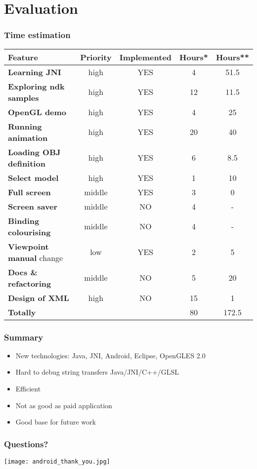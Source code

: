 \section{Evaluation} %
\begin{frame}\frametitle{Time estimation} 
\begin{tabular}{| l || c | c |  c | c |}
\hline
Feature & Priority & Implemented & Hours* & Hours**\\
\hline
\hline
\textbf{Learning JNI} & high & YES &                 4 & 51.5\\
\textbf{Exploring ndk samples} & high & YES &       12 & 11.5\\
\textbf{OpenGL demo} & high & YES &                  4 & 25\\
\textbf{Running animation} & high & YES &           20 & 40\\
\textbf{Loading OBJ definition} & high & YES &       6 &  8.5\\
\textbf{Select model} & high & YES &                 1 & 10\\
\textbf{Full screen} & middle & YES &                3 &  0\\
\textbf{Screen saver} & middle & NO &                4 &  -\\
\textbf{Binding colourising} & middle & NO &         4 & -\\
\textbf{Viewpoint manual} change & low & YES &       2 & 5\\
\textbf{Docs \& refactoring} & middle & NO &         5 & 20\\
\textbf{Design of XML} & high & NO &                15 & 1\\
\hline
\textbf{Totally} & & &                                80 & 172.5 \\
\hline
\end{tabular}
\end{frame}

\begin{frame}\frametitle{Summary} 
\begin{itemize}
    \item New technologies: Java, JNI, Android, Eclipse, OpenGLES 2.0
    \item Hard to debug string transfers Java/JNI/C++/GLSL
    \item Efficient
    \item Not as good as paid application
    \item Good base for future work
\end{itemize}
\end{frame}


\begin{frame}\frametitle{Questions?} 
\begin{center}
\texttt{[image: android\_thank\_you.jpg]}
\end{center}
\end{frame}
